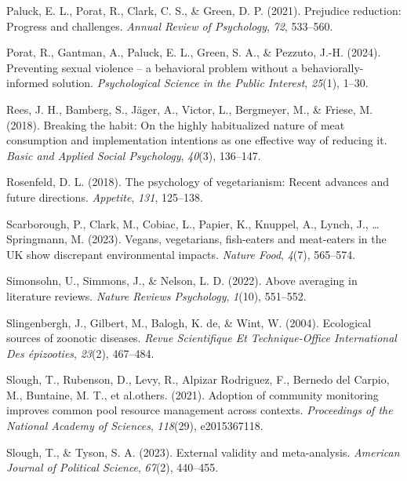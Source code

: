 \documentclass[
  man]{apa6}
\newlength{\cslhangindent}
\newenvironment{CSLReferences}[2] %
 {\begin{list}{}{%
  \setlength{\itemindent}{0pt}
  \setlength{\leftmargin}{0pt}
  \setlength{\parsep}{0pt}
  \ifodd #1
   \setlength{\leftmargin}{\cslhangindent}
   \setlength{\itemindent}{-1\cslhangindent}
  \fi
  \setlength{\itemsep}{#2\baselineskip}}}
 {\end{list}}
\begin{document}
\begin{CSLReferences}{1}{0}
Paluck, E. L., Porat, R., Clark, C. S., \& Green, D. P. (2021). Prejudice reduction: Progress and challenges. \emph{Annual Review of Psychology}, \emph{72}, 533--560.

Porat, R., Gantman, A., Paluck, E. L., Green, S. A., \& Pezzuto, J.-H. (2024). Preventing sexual violence -- a behavioral problem without a behaviorally-informed solution. \emph{Psychological Science in the Public Interest}, \emph{25}(1), 1--30.

Rees, J. H., Bamberg, S., Jäger, A., Victor, L., Bergmeyer, M., \& Friese, M. (2018). Breaking the habit: On the highly habitualized nature of meat consumption and implementation intentions as one effective way of reducing it. \emph{Basic and Applied Social Psychology}, \emph{40}(3), 136--147.

Rosenfeld, D. L. (2018). The psychology of vegetarianism: Recent advances and future directions. \emph{Appetite}, \emph{131}, 125--138.

Scarborough, P., Clark, M., Cobiac, L., Papier, K., Knuppel, A., Lynch, J., \ldots{} Springmann, M. (2023). Vegans, vegetarians, fish-eaters and meat-eaters in the UK show discrepant environmental impacts. \emph{Nature Food}, \emph{4}(7), 565--574.

Simonsohn, U., Simmons, J., \& Nelson, L. D. (2022). Above averaging in literature reviews. \emph{Nature Reviews Psychology}, \emph{1}(10), 551--552.

Slingenbergh, J., Gilbert, M., Balogh, K. de, \& Wint, W. (2004). Ecological sources of zoonotic diseases. \emph{Revue Scientifique Et Technique-Office International Des {é}pizooties}, \emph{23}(2), 467--484.

Slough, T., Rubenson, D., Levy, R., Alpizar Rodriguez, F., Bernedo del Carpio, M., Buntaine, M. T., et al.others. (2021). Adoption of community monitoring improves common pool resource management across contexts. \emph{Proceedings of the National Academy of Sciences}, \emph{118}(29), e2015367118.

Slough, T., \& Tyson, S. A. (2023). External validity and meta-analysis. \emph{American Journal of Political Science}, \emph{67}(2), 440--455.


\end{CSLReferences}
\end{document}
